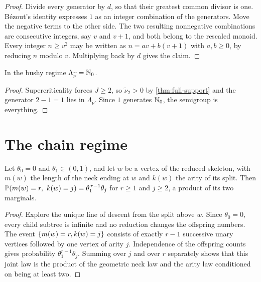 \begin{proof}
\leanok
Divide every generator by $d$, so that their greatest common divisor is one. B\'ezout's identity
expresses $1$ as an integer combination of the generators. Move the negative terms to the other
side. The two resulting nonnegative combinations are consecutive integers, say $v$ and $v+1$,
and both belong to the rescaled monoid. Every integer $n\geq v^2$ may be written as
$n=av+b(v+1)$ with $a,b\geq0$, by reducing $n$ modulo $v$. Multiplying back by $d$ gives the
claim.
\end{proof}

\begin{corollary}
\label{thm:bushy-semigroup}
\leanok
{}
In the bushy regime $\Lambda_{\widetilde\nu}=\mathbb{N}_0$.
\end{corollary}

\begin{proof}
\leanok
{}
Supercriticality forces $J\geq2$, so $\widetilde\nu_2>0$ by \cref{thm:full-support} and the
generator $2-1=1$ lies in $\Lambda_{\widetilde\nu}$. Since $1$ generates $\mathbb{N}_0$, the
semigroup is everything.
\end{proof}

\section{The chain regime}

\begin{lemma}
\label{thm:chain-independence}
\leanok
Let $\theta_0=0$ and $\theta_1\in(0,1)$, and let $w$ be a vertex of the reduced skeleton, with
$m(w)$ the length of the neck ending at $w$ and $k(w)$ the arity of its split. Then
$\bbP(m(w)=r,\ k(w)=j)=\theta_1^{\,r-1}\theta_j$ for $r\geq1$ and $j\geq2$, a product of its
two marginals.
\end{lemma}

\begin{proof}
\leanok
{}
Explore the unique line of descent from the split above $w$. Since $\theta_0=0$, every child
subtree is infinite and no reduction changes the offspring numbers. The event
$\{m(w)=r,k(w)=j\}$ consists of exactly $r-1$ successive unary vertices followed by one
vertex of arity $j$. Independence of the offspring counts gives probability
$\theta_1^{r-1}\theta_j$. Summing over $j$ and over $r$ separately shows that this joint law is
the product of the geometric neck law and the arity law conditioned on being at least two.
\end{proof}

